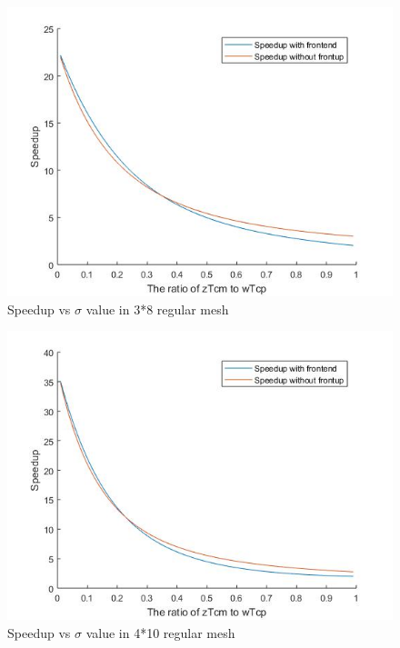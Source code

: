 \begin{figure}[h]
\centering\includegraphics[width=0.7\linewidth]{figure/c38}
\caption{Speedup vs $\sigma$ value in 3*8 regular mesh}
\label{38}
\end{figure}

\begin{figure}[h]
\centering\includegraphics[width=0.7\linewidth]{figure/c410}
\caption{Speedup vs $\sigma$ value in 4*10 regular mesh}
\label{410}
\end{figure}


